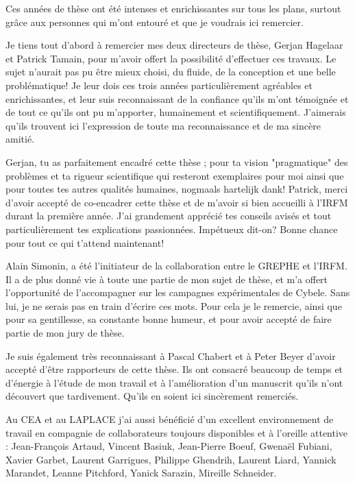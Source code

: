 \thispagestyle{preface}
Ces années de thèse ont été intenses et enrichissantes sur tous
les plans, surtout grâce aux personnes qui m’ont entouré et que je voudrais ici
remercier.

Je tiens tout d'abord à remercier mes deux directeurs de thèse, Gerjan Hagelaar
et Patrick Tamain, pour m'avoir offert la possibilité d'effectuer ces travaux.
Le sujet n'aurait pas pu être mieux choisi, du fluide, de la conception et une
belle problématique! Je leur dois ces trois années
particulièrement agréables et enrichissantes, et leur suis reconnaissant de la
confiance qu'ils m'ont témoignée et de tout ce qu'ils ont pu m'apporter,
humainement et scientifiquement. J'aimerais qu'ils trouvent ici l'expression de toute ma
reconnaissance et de ma sincère amitié. 

Gerjan, tu as parfaitement encadré cette
thèse ; pour ta vision "pragmatique" des problèmes et ta rigueur
scientifique qui resteront exemplaires pour moi ainsi que pour toutes tes autres
qualités humaines, nogmaals hartelijk dank!
Patrick, merci d'avoir accepté de co-encadrer cette thèse et de m'avoir si bien
accueilli à l'IRFM durant la première année. J'ai grandement apprécié tes
conseils avisés et tout particulièrement tes explications passionnées.
Impétueux dit-on? Bonne chance pour tout ce qui t'attend maintenant!

Alain Simonin, a été l'initiateur de la collaboration entre le GREPHE et
l'IRFM. Il a de plus donné vie à toute une partie de mon sujet de
thèse, et m'a offert l'opportunité de l'accompagner sur les campagnes
expérimentales de Cybele. Sans lui, je ne serais pas en train d'écrire ces mots.
Pour cela je le remercie, ainsi que pour sa gentillesse, sa constante bonne
humeur, et pour avoir accepté de faire partie de mon jury de thèse.

Je suis également très reconnaissant à Pascal Chabert et à Peter Beyer d'avoir
accepté d'être rapporteurs de cette thèse. Ils ont consacré
beaucoup de temps et d'énergie à l'étude de mon travail et à l'amélioration d'un
manuscrit qu'ils n'ont découvert que tardivement. Qu'ils en soient ici
sincèrement remerciés.

Au CEA et au LAPLACE j’ai aussi bénéficié d’un excellent
environnement de travail en compagnie de collaborateurs toujours disponibles et
à l'oreille attentive :
Jean-François Artaud, Vincent Basiuk,
Jean-Pierre Boeuf,
Gwenaël Fubiani,
Xavier Garbet,
Laurent Garrigues,
Philippe Ghendrih, 
Laurent Liard,
Yannick Marandet,
Leanne Pitchford,
Yanick Sarazin,
Mireille Schneider. 


